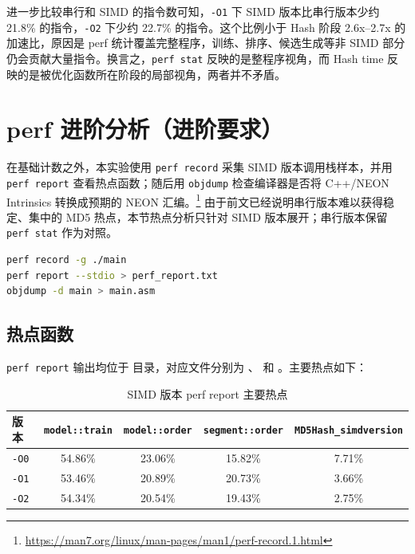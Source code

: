 \documentclass[UTF8,a4paper,12pt]{ctexart}
\begin{document}
进一步比较串行和 SIMD 的指令数可知，\texttt{-O1} 下 SIMD 版本比串行版本少约 21.8\% 的指令，\texttt{-O2} 下少约 22.7\% 的指令。这个比例小于 Hash 阶段 2.6x--2.7x 的加速比，原因是 perf 统计覆盖完整程序，训练、排序、候选生成等非 SIMD 部分仍会贡献大量指令。换言之，\texttt{perf stat} 反映的是整程序视角，而 Hash time 反映的是被优化函数所在阶段的局部视角，两者并不矛盾。

\section{perf 进阶分析（进阶要求）}

在基础计数之外，本实验使用 \texttt{perf record} 采集 SIMD 版本调用栈样本，并用 \texttt{perf report} 查看热点函数；随后用 \texttt{objdump} 检查编译器是否将 C++/NEON Intrinsics 转换成预期的 NEON 汇编。\footnote{\url{https://man7.org/linux/man-pages/man1/perf-record.1.html}} 由于前文已经说明串行版本难以获得稳定、集中的 MD5 热点，本节热点分析只针对 SIMD 版本展开；串行版本保留 \texttt{perf stat} 作为对照。

\begin{lstlisting}[style=cppstyle,caption={热点和汇编分析命令},language=bash]
perf record -g ./main
perf report --stdio > perf_report.txt
objdump -d main > main.asm
\end{lstlisting}

\subsection{热点函数}

\texttt{perf report} 输出均位于  目录，对应文件分别为 、 和 。主要热点如下：

\begin{table}[htbp]
    \centering
    \caption{SIMD 版本 perf report 主要热点}
    \small
    \begin{tabular}{lcccc}
        \toprule
        版本 & \texttt{model::train} & \texttt{model::order} & \texttt{segment::order} & \texttt{MD5Hash\_simdversion} \\
        \midrule
        \texttt{-O0} & 54.86\% & 23.06\% & 15.82\% & 7.71\% \\
        \texttt{-O1} & 53.46\% & 20.89\% & 20.73\% & 3.66\% \\
        \texttt{-O2} & 54.34\% & 20.54\% & 19.43\% & 2.75\% \\
        \bottomrule
    \end{tabular}
\end{table}
\end{document}
